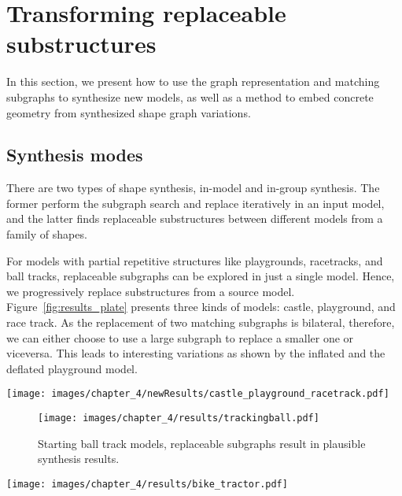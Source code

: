 \section{Transforming replaceable substructures}

In this section, we present how to use the graph representation and matching subgraphs to synthesize new models, as well as a method to embed concrete geometry from synthesized shape graph variations.

\subsection{Synthesis modes}

There are two types of shape synthesis, in-model and in-group synthesis. The former perform the subgraph search and replace iteratively in an input model, and the latter finds replaceable substructures between different models from a family of shapes.


For models with partial repetitive structures like playgrounds, racetracks, and ball tracks, replaceable subgraphs can be explored in just a single model. Hence, we progressively replace substructures from a source model. Figure~\ref{fig:results_plate} presents three kinds of models: castle, playground, and race track. As the replacement of two matching subgraphs is bilateral, therefore, we can either choose to use a large subgraph to replace a smaller one or viceversa. This leads to interesting variations as shown by the inflated and the deflated playground model.

\begin{figure*}[t!]
	\centering
		\texttt{[image: images/chapter\_4/newResults/castle\_playground\_racetrack.pdf]}
		\caption{Starting from single castle, playground, racetrack models, matching subgraphs are progressively found and replaced.}
\label{fig:results_plate}
\vnudge
\end{figure*}

\begin{figure}
\vnudge
	\centering
		\texttt{[image: images/chapter\_4/results/trackingball.pdf]}
		\caption{Starting  ball track models, replaceable subgraphs result in plausible synthesis results.}
	\label{fig:results_trackingball}
\end{figure}


\begin{figure*}[t!]
	\centering
		\texttt{[image: images/chapter\_4/results/bike\_tractor.pdf]}
		\caption{Synthesized bikes created from only 3 bike models, with 13, 15, and 16 parts, respectively. We show two graphs and associated highlight matching cuts/subgraphs on the right of each synthesized bike, the subgraph in the upper graph get replaced by the matching subgraph in the lower one. The synthesized results of toy tractors were created from 4 input models. }
	\label{fig:results_bikes}
\vnudge
\end{figure*}

